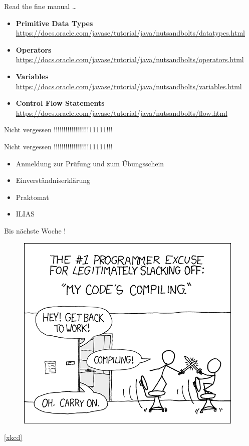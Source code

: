 \documentclass[18pt]{beamer}
\begin{document}
\appendix
\beginbackup

\begin{frame}{Read the fine manual \dots}
    \begin{itemize}
        \item \textbf{Primitive Data Types} \url{https://docs.oracle.com/javase/tutorial/java/nutsandbolts/datatypes.html}
        \item \textbf{Operators} \url{https://docs.oracle.com/javase/tutorial/java/nutsandbolts/operators.html}
        \item \textbf{Variables} \url{https://docs.oracle.com/javase/tutorial/java/nutsandbolts/variables.html}
        \item \textbf{Control Flow Statements} \url{https://docs.oracle.com/javase/tutorial/java/nutsandbolts/flow.html}
    \end{itemize}
\end{frame}

\begin{frame}{Nicht vergessen !!!!!!!!!!!!!!!!!!11111!!!}
    \begin{alertblock}{Nicht vergessen !!!!!!!!!!!!!!!!!!11111!!!}
        \begin{itemize}
        \item Anmeldung zur Prüfung und zum Übungsschein
        \item Einverständniserklärung
        \item Praktomat
        \item ILIAS
        \end{itemize}
    \end{alertblock}
\end{frame}

\begin{frame}{Bis nächste Woche !}
    \begin{figure}
        \includegraphics[scale=0.5]{img/compiling.png}
    \end{figure}
    \href{https://xkcd.com/303/}{[xkcd]}
\end{frame}

\backupend
\end{document}
